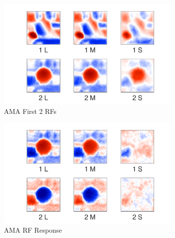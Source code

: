 \documentclass{jov}
\begin{document}
\begin{figure}
\centering
    \begin{subfigure}[b]{0.27 \textwidth}   
        \includegraphics[width=\textwidth]{../Figures/Figure12/Figure12_a.pdf}
        \caption{AMA First 2 RFs}
        \label{fig:case12AMA}
    \end{subfigure}
        \begin{subfigure}[b]{0.20 \textwidth}
        \includegraphics[width=\textwidth]{../Figures/Figure12/Figure12_b.pdf}
        \caption{AMA RF Response}
        \label{fig:case12FiltersResponse}
    \end{subfigure}    
        \begin{subfigure}[b]{0.2 \textwidth}

\end{subfigure}
\end{figure}
\end{document}
